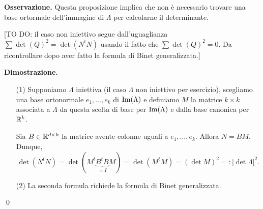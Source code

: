 \textbf{Osservazione.} Questa proposizione implica che non è necessario trovare una base ortormale dell'immagine di $\Lambda$ per calcolarne il determinante.

[TO DO: il caso non iniettivo segue dall'uguaglianza $\sum \det(Q)^2 = \det(N^t N)$ usando il fatto che $\sum \det(Q)^2 = 0$. Da ricontrollare dopo aver fatto la formula di Binet generalizzata.]

\textbf{Dimostrazione.} 
\begin{itemize}

	\item[(1)] Supponiamo $\Lambda$ iniettiva (il caso $\Lambda$ non iniettivo per esercizio), scegliamo una base ortonormale $e_1,\ldots,e_k$ di $\operatorname{Im}(\Lambda)$ e definiamo $M$ la matrice $k \times k$ associata a $\Lambda$ da questa scelta di base per $\operatorname{Im}(\Lambda)$ e dalla base canonica per $\mathbb R^k$.

	Sia $B \in \mathbb R^{d \times k}$ la matrice avente colonne uguali a $e_1,\ldots,e_k$. Allora $N = BM$.
	Dunque, 
	$$
		\det(N^t N) = \det(M^t \underbrace{B^t B}_{= I} M) = \det (M^t M) = (\det M)^2 =: |\det \Lambda|^2.
	$$
	

	\item[(2)] La seconda formula richiede la formula di Binet generalizzata.

\end{itemize}
\qed
